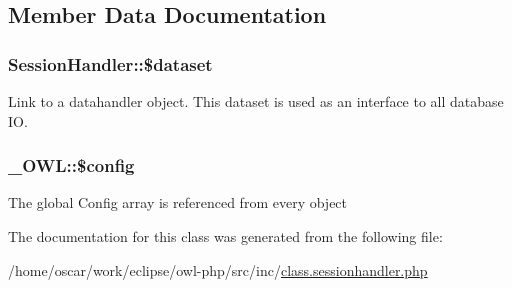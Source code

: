 \subsection{Member Data Documentation}
\hypertarget{classSessionHandler_74c46fcfbadd4c4e6bacc73ddf350056}{
\subsubsection{\setlength{\rightskip}{0pt plus 5cm}SessionHandler::\$dataset}}
\label{classSessionHandler_74c46fcfbadd4c4e6bacc73ddf350056}


Link to a datahandler object. This dataset is used as an interface to all database IO. \hypertarget{class__OWL_f37a011667dda12fc417a68a6f3077d1}{
\subsubsection{\setlength{\rightskip}{0pt plus 5cm}\_\-OWL::\$config}}
\label{class__OWL_f37a011667dda12fc417a68a6f3077d1}


The global Config array is referenced from every object 

The documentation for this class was generated from the following file:\begin{CompactItemize}
\item 
/home/oscar/work/eclipse/owl-php/src/inc/\hyperlink{class_8sessionhandler_8php}{class.sessionhandler.php}\end{CompactItemize}
